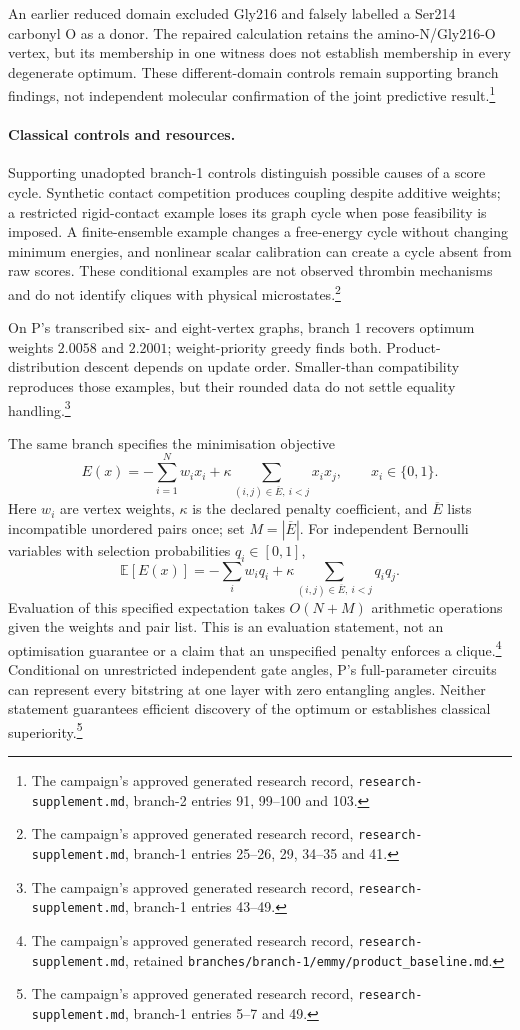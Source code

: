 \documentclass{article}
\newcommand{\rr}[1]{\footnote{The campaign's approved generated research record, \texttt{research-supplement.md}, #1.}}
\begin{document}
An earlier reduced domain excluded Gly216 and falsely labelled a Ser214 carbonyl O as a donor. The repaired calculation retains the amino-N/Gly216-O vertex, but its membership in one witness does not establish membership in every degenerate optimum. These different-domain controls remain supporting branch findings, not independent molecular confirmation of the joint predictive result.\rr{branch-2 entries 91, 99--100 and 103}

\paragraph{Classical controls and resources.}
Supporting unadopted branch-1 controls distinguish possible causes of a score cycle. Synthetic contact competition produces coupling despite additive weights; a restricted rigid-contact example loses its graph cycle when pose feasibility is imposed. A finite-ensemble example changes a free-energy cycle without changing minimum energies, and nonlinear scalar calibration can create a cycle absent from raw scores. These conditional examples are not observed thrombin mechanisms and do not identify cliques with physical microstates.\rr{branch-1 entries 25--26, 29, 34--35 and 41}

On P's transcribed six- and eight-vertex graphs, branch 1 recovers optimum weights \(2.0058\) and \(2.2001\); weight-priority greedy finds both. Product-distribution descent depends on update order. Smaller-than compatibility reproduces those examples, but their rounded data do not settle equality handling.\rr{branch-1 entries 43--49}

The same branch specifies the minimisation objective
\[
 E(x)=-\sum_{i=1}^N w_i x_i+\kappa\sum_{(i,j)\in\overline E,\ i<j}x_ix_j,\qquad x_i\in\{0,1\}.
\]
Here \(w_i\) are vertex weights, \(\kappa\) is the declared penalty coefficient, and \(\overline E\) lists incompatible unordered pairs once; set \(M=|\overline E|\). For independent Bernoulli variables with selection probabilities \(q_i\in[0,1]\),
\[
 \mathbb E[E(x)]=-\sum_iw_iq_i+\kappa\sum_{(i,j)\in\overline E,\ i<j}q_iq_j.
\]
Evaluation of this specified expectation takes \(O(N+M)\) arithmetic operations given the weights and pair list. This is an evaluation statement, not an optimisation guarantee or a claim that an unspecified penalty enforces a clique.\rr{retained \texttt{branches/branch-1/emmy/product\_baseline.md}} Conditional on unrestricted independent gate angles, P's full-parameter circuits can represent every bitstring at one layer with zero entangling angles. Neither statement guarantees efficient discovery of the optimum or establishes classical superiority.\cite{P}\rr{branch-1 entries 5--7 and 49}
\end{document}
